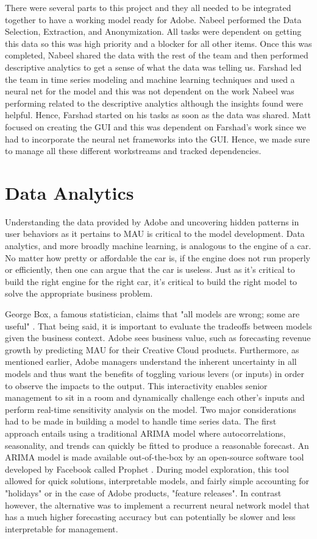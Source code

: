 \documentclass[11pt, oneside, authoryear]{report}
\begin{document}
There were several parts to this project and they all needed to be integrated together to have a working model ready for Adobe. Nabeel performed the Data Selection, Extraction, and Anonymization. All tasks were dependent on getting this data so this was high priority and a blocker for all other items. Once this was completed, Nabeel shared the data with the rest of the team and then performed descriptive analytics to get a sense of what the data was telling us. Farshad led the team in time series modeling and machine learning techniques and used a neural net for the model and this was not dependent on the work Nabeel was performing related to the descriptive analytics although the insights found were helpful. Hence, Farshad started on his tasks as soon as the data was shared. Matt focused on creating the GUI and this was dependent on Farshad's work since we had to incorporate the neural net frameworks into the GUI. Hence, we made sure to manage all these different workstreams and tracked dependencies.

\section{Data Analytics}
Understanding the data provided by Adobe and uncovering hidden patterns in user behaviors as it pertains to MAU is critical to the model development. Data analytics, and more broadly machine learning, is analogous to the engine of a car.  No matter how pretty or affordable the car is, if the engine does not run properly or efficiently, then one can argue that the car is useless.  Just as it's critical to build the right engine for the right car, it's critical to build the right model to solve the appropriate business problem.

George Box, a famous statistician, claims that "all models are wrong; some are useful" \citep{box}. That being said, it is important to evaluate the tradeoffs between models given the business context. Adobe sees business value, such as forecasting revenue growth by predicting MAU for their Creative Cloud products. Furthermore, as mentioned earlier, Adobe managers understand the inherent uncertainty in all models and thus want the benefits of toggling various levers (or inputs) in order to observe the impacts to the output. This interactivity enables senior management to sit in a room and dynamically challenge each other's inputs and perform real-time sensitivity analysis on the model.
Two major considerations had to be made in building a model to handle time series data. The first approach entails using a traditional ARIMA model where autocorrelations, seasonality, and trends can quickly be fitted to produce a reasonable forecast. An ARIMA model is made available out-of-the-box by an open-source software tool developed by Facebook called Prophet \citep{taylor}.  During model exploration, this tool allowed for quick solutions, interpretable models, and fairly simple accounting for "holidays" or in the case of Adobe products, "feature releases".  In contrast however, the alternative was to implement a recurrent neural network model that has a much higher forecasting accuracy but can potentially be slower and less interpretable for management.
\end{document}
